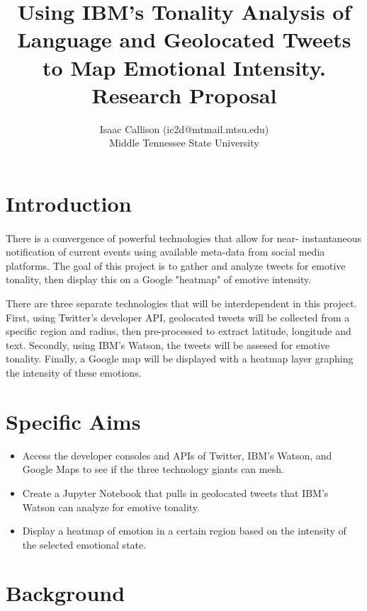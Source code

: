 \documentclass[12pt, oneside]{article}
\title{Using IBM's Tonality Analysis of Language and Geolocated Tweets to Map Emotional Intensity.
\\\medskip Research Proposal}
\author{Isaac Callison (ic2d@mtmail.mtsu.edu)\\Middle Tennessee State University}
\begin{document}
\maketitle
\nocite{*}
\newpage{}

\section{Introduction}
\paragraph{}
There is a convergence of powerful technologies that allow for near-
instantaneous notification of current events using available meta-data from
social media platforms. The goal of this project is to gather and analyze
tweets for emotive tonality, then display this on a Google "heatmap" of emotive
intensity.

There are three separate technologies that will be interdependent in this
project. First, using Twitter's developer API, geolocated tweets will be
collected from a specific region and radius, then pre-processed to extract
latitude, longitude and text. Secondly, using IBM's Watson, the tweets will be
assesed for emotive tonality. Finally, a Google map will be displayed with a
heatmap layer graphing the intensity of these emotions.


\section{Specific Aims}
\begin{itemize}
 \item Access the developer consoles and APIs of Twitter, IBM's Watson, and Google Maps to see if the three technology giants can mesh.

 \item Create a Jupyter Notebook that pulls in geolocated tweets that IBM's
 Watson can analyze for emotive tonality.

 \item Display a heatmap of emotion in a certain region based on the intensity
 of the selected emotional state.

\end{itemize}

\section{Background}
\end{document}
